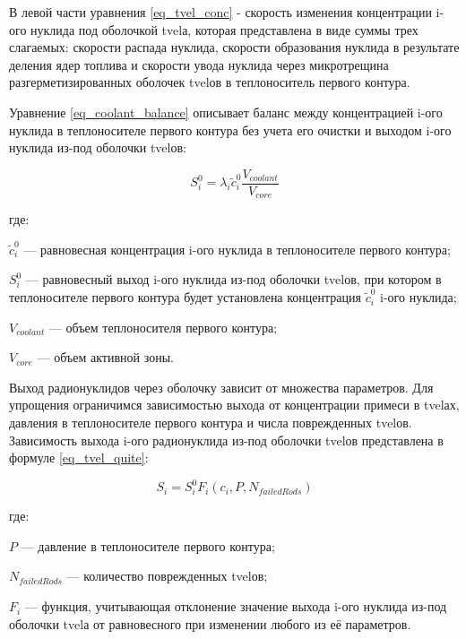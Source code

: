 В левой части уравнения \ref{eq_tvel_conc} - скорость изменения концентрации i-ого нуклида под оболочкой \ac{tvel}а, 
которая представлена в виде суммы трех слагаемых: скорости распада нуклида, скорости образования нуклида в результате 
деления ядер топлива и скорости увода нуклида через микротрещина разгерметизированных оболочек \ac{tvel}ов в 
теплоноситель первого контура.

Уравнение \ref{eq_coolant_balance} описывает баланс между концентрацией i-ого нуклида в теплоносителе первого контура 
без учета его очистки и выходом i-ого нуклида из-под оболочки \ac{tvel}ов:

\begin{equation}
    \label{eq_coolant_balance}
    S_{i}^{0} = \lambda_{i}\widetilde{c}_{i}^{0}\frac{V_{coolant}}{V_{core}}
\end{equation}

где:
\begin{description}
    \item $\widetilde{c}_{i}^{0}$ --- равновесная концентрация i-ого нуклида в теплоносителе первого контура;
    \item $S_{i}^{0}$ --- равновесный выход i-ого нуклида из-под оболочки \ac{tvel}ов, при котором в 
        теплоносителе первого контура будет установлена концентрация $\widetilde{c}_{i}^{0}$ i-ого нуклида;
    \item $V_{coolant}$ --- объем теплоносителя первого контура;
    \item $V_{core}$ --- объем активной зоны.
\end{description}

Выход радионуклидов через оболочку зависит от множества параметров. Для упрощения ограничимся зависимостью выхода от 
концентрации примеси в \ac{tvel}ах, давления в теплоносителе первого контура и числа поврежден­ных \ac{tvel}ов. 
Зависимость выхода i-ого радионуклида из-под оболочки \ac{tvel}ов представлена в формуле \ref{eq_tvel_quite}:

\begin{equation}
    \label{eq_tvel_quite}
    S_{i} = S_{i}^{0}F_{i}(c_{i}, P, N_{failedRods})
\end{equation}

где:
\begin{description}
    \item $P$ --- давление в теплоносителе первого контура;
    \item $N_{failedRods}$ --- количество поврежденных \ac{tvel}ов;
    \item $F_{i}$ --- функция, учитывающая отклонение значение выхода i-ого нуклида из-под оболочки \ac{tvel}а от 
        равновесного при изменении любого из её параметров.
\end{description}

